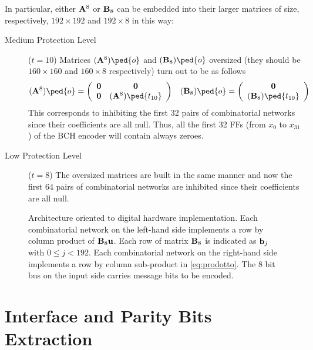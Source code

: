 In particular, either \(\mathbf{A}^8\) or \(\mathbf{B}_8\) can be embedded into their larger matrices of size, respectively, \(192 \times 192\) and \(192 \times 8\) in this way:
\begin{description}
\item[Medium Protection Level](\(t=10\)) Matrices \((\vet A^8)\ped{o}\) and \((\vet B_8)\ped{o}\) oversized (they should be \(160 \times 160\) and \(160 \times 8\) respectively) turn out to be as follows
    \begin{align}
    (\vet A^8)\ped{o} &=
    \left(
    \begin{array}{cc}
    \vet 0 & \vet 0 \\
    \vet 0 & (\vet A^8)\ped{t_{10}}
    \end{array}
    \right) &
    (\vet B_8)\ped{o} &=
    \left(
    \begin{array}{c}
    \vet 0 \\
    (\vet B_8)\ped{t_{10}}
    \end{array}
    \right)
    \end{align} \label{eq:embedding}
    This corresponds to inhibiting the first 32 pairs of combinatorial networks since their coefficients are all null. Thus, all the first 32 FFs (from \(x_0\) to \(x_{31}\)) of the BCH encoder will contain always zeroes.
\item[Low Protection Level](\(t=8\)) The oversized matrices are built in the same manner and now the first 64 pairs of combinatorial networks are inhibited since their coefficients are all null.
\end{description}

\begin{figure} \centering

\caption{Architecture oriented to digital hardware implementation. Each combinatorial network on the left-hand side implements a row by column product of \(\mathbf{B}_8 \mathbf{u}\). Each row of matrix \(\mathbf{B}_8\) is indicated as \(\mathbf{b}_j\) with \(0\leq j<192\). Each combinatorial network on the right-hand side implements a row by column sub-product in \eqref{eq:prodotto}. The 8 bit bus on the input side carries message bits to be encoded.} \label{fig:HWarch}
\end{figure}


\section{Interface and Parity Bits Extraction}

